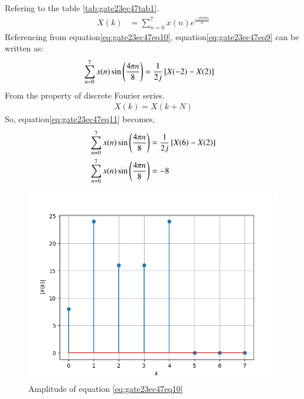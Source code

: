 \documentclass[journal,12pt,onecolumn]{IEEEtran}
\theoremstyle{remark}
\begin{document}
\begin{enumerate}
Refering to the table \ref{tab:gate23ec47tab1}.
\begin{align}
X(k)&=\sum\limits_{n=0}^{7} x(n)e^{\frac{-j2\pi kn}{8}}\label{eq:gate23ec47eq10}
\end{align}
Referencing from equation\eqref{eq:gate23ec47eq10}, equation\eqref{eq:gate23ec47eq9} can be written as:
\begin{align}
\sum\limits_{n=0}^{7}x(n) \sin\left(\frac{4\pi n}{8}\right)&=\frac{1}{2j}{}\left[X(-2)-X(2)\right]\label{eq:gate23ec47eq11}
\end{align}
From the property of discrete Fourier series.\\
\begin{align}
X(k)=X(k+N)
\end{align}
So, equation\eqref{eq:gate23ec47eq11} becomes,\\
\begin{align}
\sum\limits_{n=0}^{7}x(n) \sin\left(\frac{4\pi n}{8}\right)&=\frac{1}{2j}{}\left[X(6)-X(2)\right]\\
\sum\limits_{n=0}^{7}x(n) \sin\left(\frac{4\pi n}{8}\right)&=-8
\end{align}
\begin{figure}[h!]
    \centering
    \includegraphics[width=\columnwidth]{figs/mm2.png}
    \caption{Amplitude of equation \eqref{eq:gate23ec47eq10}}
    \label{fig:gate23ec47fig3}
\end{figure}
\begin{figure}[h!]
    \centering

\end{figure}
\end{enumerate}
\end{document}
